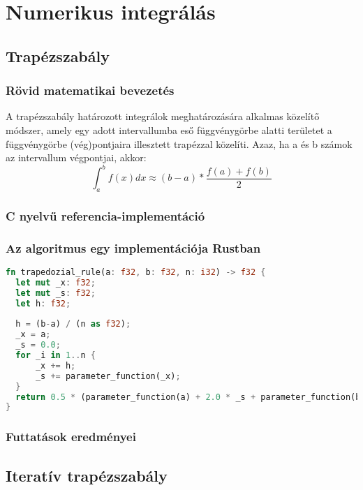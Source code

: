 

\section{Numerikus integrálás}

\subsection{Trapézszabály}
\subsubsection{Rövid matematikai bevezetés}
A trapézszabály határozott integrálok meghatározására alkalmas közelítő módszer, amely egy adott intervallumba eső függvénygörbe alatti területet a függvénygörbe (vég)pontjaira illesztett trapézzal közelíti. Azaz, ha a és b számok az intervallum végpontjai, akkor:
\[ \int_{a}^{b} f(x) dx \approx (b-a) * \frac{f(a) + f(b)}{2} \]
\subsubsection{C nyelvű referencia-implementáció}
\subsubsection{Az algoritmus egy implementációja Rustban}
\begin{lstlisting}[language=Rust, style=boxed]
fn trapedozial_rule(a: f32, b: f32, n: i32) -> f32 {
  let mut _x: f32;
  let mut _s: f32;
  let h: f32;
  
  h = (b-a) / (n as f32);
  _x = a;
  _s = 0.0;
  for _i in 1..n {
	  _x += h;
	  _s += parameter_function(_x);
  }
  return 0.5 * (parameter_function(a) + 2.0 * _s + parameter_function(b) );
}
\end{lstlisting}

\subsubsection{Futtatások eredményei} %

\subsection{Iteratív trapézszabály}
